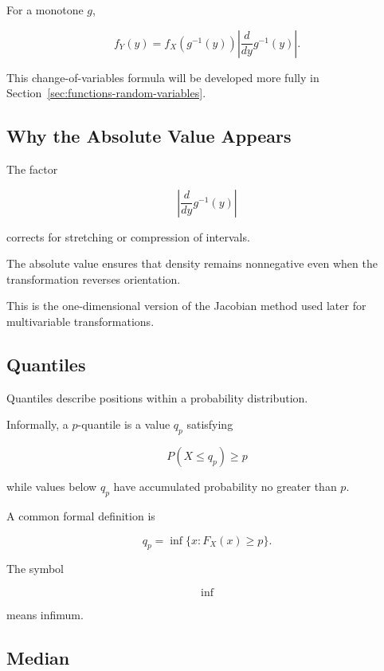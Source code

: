 For a monotone \(g\),

\[
\boxed{
f_Y(y)
=
f_X(g^{-1}(y))
\left|
\frac{d}{dy}g^{-1}(y)
\right|.
}
\]

This change-of-variables formula will be developed more fully in
Section~\ref{sec:functions-random-variables}.

\subsection{Why the Absolute Value Appears}
\label{subsec:jacobian-absolute-value-preview}

The factor

\[
\left|
\frac{d}{dy}g^{-1}(y)
\right|
\]

corrects for stretching or compression of intervals.

The absolute value ensures that density remains nonnegative even when
the transformation reverses orientation.

This is the one-dimensional version of the Jacobian method used later
for multivariable transformations.

\subsection{Quantiles}
\label{subsec:random-variable-quantiles}

Quantiles describe positions within a probability distribution.

Informally, a \(p\)-quantile is a value \(q_p\) satisfying

\[
\boxed{
P(X\leq q_p)
\geq p
}
\]

while values below \(q_p\) have accumulated probability no greater than
\(p\).

A common formal definition is

\[
\boxed{
q_p
=
\inf
\{
x:F_X(x)\geq p
\}.
}
\]

The symbol

\[
\inf
\]

means infimum.

\subsection{Median}
\label{subsec:random-variable-median}

